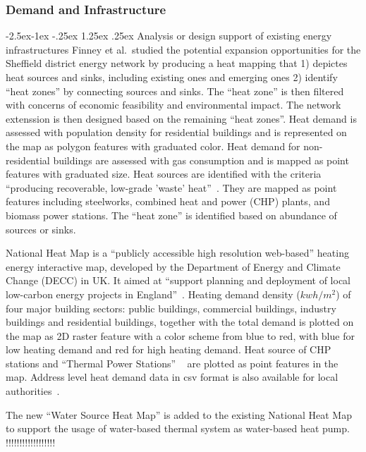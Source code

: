 \documentclass[hidelinks,12pt]{article}
\makeatletter
\renewcommand\paragraph{\@startsection{paragraph}{4}{\z@}%
            {-2.5ex\@plus -1ex \@minus -.25ex}%
            {1.25ex \@plus .25ex}%
            {\normalfont\normalsize\bfseries}}
\makeatother
\begin{document}
\subsubsection{Demand and Infrastructure}
\paragraph{Analysis or design support of existing energy
  infrastructures}
Finney et al.\ studied the potential expansion opportunities for the
Sheffield district energy network by producing a heat mapping that 1)
depictes heat sources and sinks, including existing ones and emerging
ones 2) identify ``heat zones'' by connecting sources and sinks. The
``heat zone'' is then filtered with concerns of economic feasibility
and environmental impact. The network extenssion is then designed
based on the remaining ``heat zones''. Heat demand is assessed with
population density for residential buildings and is represented on the
map as polygon features with graduated color. Heat demand for
non-residential buildings are assessed with gas consumption and is
mapped as point features with graduated size. Heat sources are
identified with the criteria ``producing recoverable, low-grade
'waste' heat''~\cite{Finney2012165}. They are mapped as point features
including steelworks, combined heat and power (CHP) plants, and
biomass power stations. The ``heat zone'' is identified based on
abundance of sources or sinks.

National Heat Map is a ``publicly accessible high resolution
web-based'' heating energy interactive map, developed by the
Department of Energy and Climate Change (DECC) in UK. It aimed at
``support planning and deployment of local low-carbon energy projects
in England''~\cite{heatMap2015}. Heating demand density ($kwh/m^2$) of
four major building sectors: public buildings, commercial buildings,
industry buildings and residential buildings, together with the total
demand is plotted on the map as 2D raster feature with a color scheme
from blue to red, with blue for low heating demand and red for high
heating demand. Heat source of CHP stations and ``Thermal Power
Stations'' ~\cite{heatMap2012} are plotted as point features in the
map. Address level heat demand data in csv format is also available
for local authorities~\cite{heatMapLocal2012}. 

The new ``Water Source Heat Map'' is added to the existing National
Heat Map to support the usage of water-based thermal system as
water-based heat pump.
!!!!!!!!!!!!!!!!!!
\end{document}
